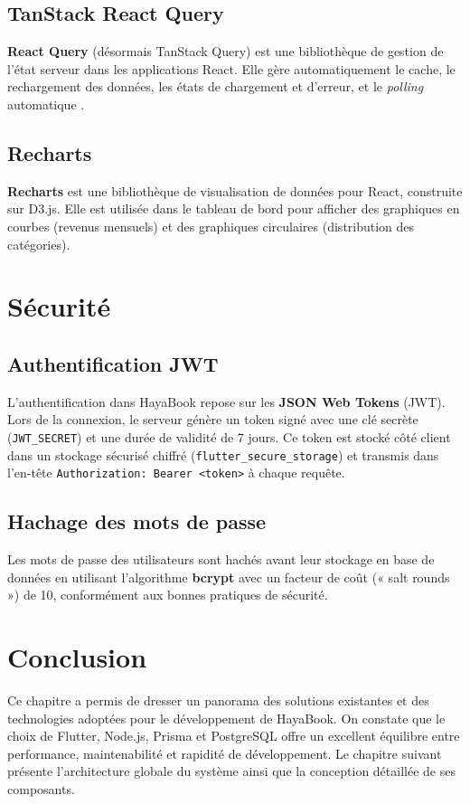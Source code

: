 \subsection{TanStack React Query}

\textbf{React Query} (désormais TanStack Query) est une bibliothèque de gestion de l'état serveur dans les applications React. Elle gère automatiquement le cache, le rechargement des données, les états de chargement et d'erreur, et le \textit{polling} automatique \cite{reactquery_docs}.

\subsection{Recharts}

\textbf{Recharts} est une bibliothèque de visualisation de données pour React, construite sur D3.js. Elle est utilisée dans le tableau de bord pour afficher des graphiques en courbes (revenus mensuels) et des graphiques circulaires (distribution des catégories).

\section{Sécurité}

\subsection{Authentification JWT}

L'authentification dans HayaBook repose sur les \textbf{JSON Web Tokens} (JWT). Lors de la connexion, le serveur génère un token signé avec une clé secrète (\texttt{JWT\_SECRET}) et une durée de validité de 7 jours. Ce token est stocké côté client dans un stockage sécurisé chiffré (\texttt{flutter\_secure\_storage}) et transmis dans l'en-tête \texttt{Authorization: Bearer <token>} à chaque requête.

\subsection{Hachage des mots de passe}

Les mots de passe des utilisateurs sont hachés avant leur stockage en base de données en utilisant l'algorithme \textbf{bcrypt} avec un facteur de coût (« salt rounds ») de 10, conformément aux bonnes pratiques de sécurité.

\section{Conclusion}

Ce chapitre a permis de dresser un panorama des solutions existantes et des technologies adoptées pour le développement de HayaBook. On constate que le choix de Flutter, Node.js, Prisma et PostgreSQL offre un excellent équilibre entre performance, maintenabilité et rapidité de développement. Le chapitre suivant présente l'architecture globale du système ainsi que la conception détaillée de ses composants.